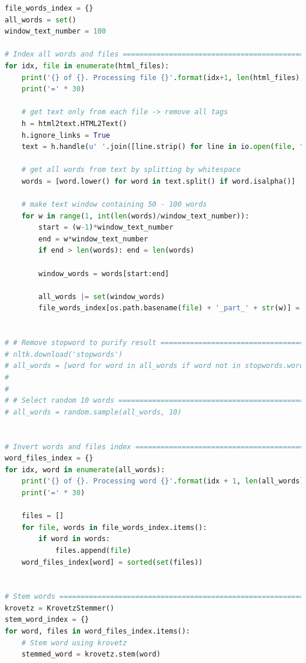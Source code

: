 \documentclass[letterpaper,11pt]{article}
\begin{document}
\begin{lstlisting}[language=python, caption={Python code for MLN1}, label={lst:mln1}]
file_words_index = {}
all_words = set()
window_text_number = 100

# Index all words and files ================================================================================
for idx, file in enumerate(html_files):
    print('{} of {}. Processing file {}'.format(idx+1, len(html_files), file))
    print('=' * 30)

    # get text only from each file -> remove all tags
    h = html2text.HTML2Text()
    h.ignore_links = True
    text = h.handle(u' '.join([line.strip() for line in io.open(file, "r", encoding="utf-8").readlines()]))

    # get all words from text by splitting by whitespace
    words = [word.lower() for word in text.split() if word.isalpha()]

    # make text window containing 50 - 100 words
    for w in range(1, int(len(words)/window_text_number)):
        start = (w-1)*window_text_number
        end = w*window_text_number
        if end > len(words): end = len(words)

        window_words = words[start:end]

        all_words |= set(window_words)
        file_words_index[os.path.basename(file) + '_part_' + str(w)] = window_words


# # Remove stopword to purify result ========================================================================
# nltk.download('stopwords')
# all_words = [word for word in all_words if word not in stopwords.words('english')]
#
#
# # Select random 10 words ==================================================================================
# all_words = random.sample(all_words, 10)


# Invert words and files index ============================================================================
word_files_index = {}
for idx, word in enumerate(all_words):
    print('{} of {}. Processing word {}'.format(idx + 1, len(all_words), word.encode('utf-8')))
    print('=' * 30)

    files = []
    for file, words in file_words_index.items():
        if word in words:
            files.append(file)
    word_files_index[word] = sorted(set(files))


# Stem words ==============================================================================================
krovetz = KrovetzStemmer()
stem_word_index = {}
for word, files in word_files_index.items():
    # Stem word using krovetz
    stemmed_word = krovetz.stem(word)


\end{lstlisting}
\end{document}
